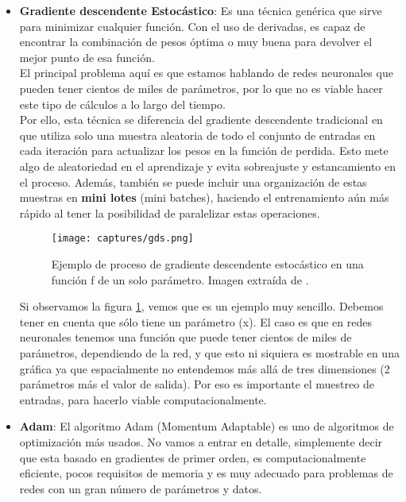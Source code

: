 \documentclass[11pt,fleqn]{book} %
\begin{document}
\begin{itemize}
	\item \textbf{Gradiente descendente Estocástico}: Es una técnica genérica que sirve para minimizar cualquier función. Con el uso de derivadas, es capaz de encontrar la combinación de pesos óptima o muy buena para devolver el mejor punto de esa función. \\
	
	El principal problema aquí es que estamos hablando de redes neuronales que pueden tener cientos de miles de parámetros, por lo que no es viable hacer este tipo de cálculos a lo largo del tiempo. \\
	
	Por ello, esta técnica se diferencia del gradiente descendente tradicional en que utiliza solo una muestra aleatoria de todo el conjunto de entradas en cada iteración para actualizar los pesos en la función de perdida. Esto mete algo de aleatoriedad en el aprendizaje y evita sobreajuste y estancamiento en el proceso. Además, también se puede incluir una organización de estas muestras en \textbf{mini lotes} (mini batches), haciendo el entrenamiento aún más rápido al tener la posibilidad de paralelizar estas operaciones.
	
	\begin{figure}[H]
		\centering\texttt{[image: captures/gds.png]}
		\caption{Ejemplo de proceso de gradiente descendente estocástico en una función f de un solo parámetro. Imagen extraída de \cite{article:ejemploGDS}.}
		\label{fig:GDS} %
	\end{figure}

	Si observamos la figura \ref{fig:GDS}, vemos que es un ejemplo muy sencillo. Debemos tener en cuenta que sólo tiene un parámetro (x). El caso es que en redes neuronales tenemos una función que puede tener cientos de miles de parámetros, dependiendo de la red, y que esto ni siquiera es mostrable en una gráfica ya que espacialmente no entendemos más allá de tres dimensiones (2 parámetros más el valor de salida). Por eso es importante el muestreo de entradas, para hacerlo viable computacionalmente. \\

	\item \textbf{Adam}: El algoritmo Adam (Momentum Adaptable) es uno de algoritmos de optimización más usados. No vamos a entrar en detalle, simplemente decir que esta basado en gradientes de primer orden, es computacionalmente eficiente, pocos requisitos de memoria y es muy adecuado para problemas de redes con un gran número de parámetros y datos.  \\
\end{itemize}
\end{document}
